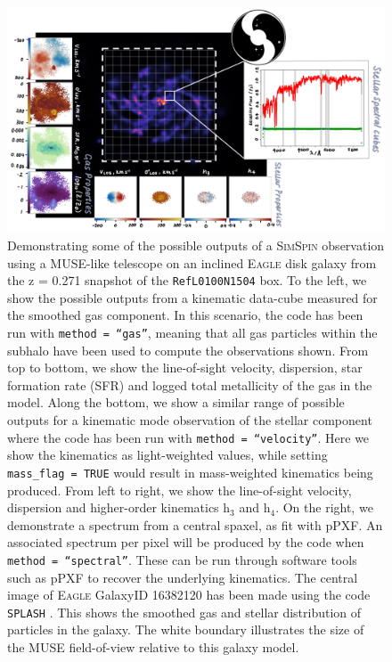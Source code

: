 \documentclass[
  journal=pasa,
  manuscript=research-paper, %
  year=2020,
  volume=37,
]{cup-journal}
\newcommand{\simspin}[1]{\textsc{SimSpin}#1} %
\newcommand{\eagle}[1]{\textsc{Eagle}#1} %
\begin{document}
\begin{figure}[ht!]
    \centering
    \includegraphics[keepaspectratio, width=17cm]{simspin_v26.png}
    \caption{Demonstrating some of the possible outputs of a \simspin{} observation using a MUSE-like telescope on an inclined \eagle{} disk galaxy from the z = 0.271 snapshot of the \texttt{RefL0100N1504} box. To the left, we show the possible outputs from a kinematic data-cube measured for the smoothed gas component. In this scenario, the code has been run with \texttt{method = ``gas''}, meaning that all gas particles within the subhalo have been used to compute the observations shown. From top to bottom, we show the line-of-sight velocity, dispersion, star formation rate (SFR) and logged total metallicity of the gas in the model. Along the bottom, we show a similar range of possible outputs for a kinematic mode observation of the stellar component where the code has been run with \texttt{method = ``velocity''}. Here we show the kinematics as light-weighted values, while setting \texttt{mass\_flag = TRUE} would result in mass-weighted kinematics being produced. From left to right, we show the line-of-sight velocity, dispersion and higher-order kinematics h$_3$ and h$_4$. On the right, we demonstrate a spectrum from a central spaxel, as fit with pPXF. An associated spectrum per pixel will be produced by the code when \texttt{method = ``spectral''}. These can be run through software tools such as pPXF to recover the underlying kinematics.  The central image of \eagle{} GalaxyID 16382120 has been made using the code \texttt{SPLASH} \citep{Price2007Splash}. This shows the smoothed gas and stellar distribution of particles in the galaxy. The white boundary illustrates the size of the MUSE field-of-view relative to this galaxy model.} 
    \label{fig:simspin_v2}
\end{figure}
\end{document}
